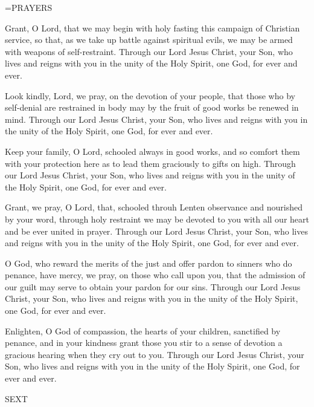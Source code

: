 \hangindent=\parindent \small PRAYERS
\begin{description}[labelindent=\parindent, noitemsep, leftmargin=*]
\item [Ash Wednesday:] 	Grant, O Lord, that we may begin with holy fasting this campaign of Christian service, so that, as we take up battle against spiritual evils, we may be armed with weapons of self-restraint. Through our Lord Jesus Christ, your Son, who lives and reigns with you in the unity of the Holy Spirit, one God, for ever and ever.
\item [Week 1:] 	Look kindly, Lord, we pray, on the devotion of your people, that those who by self-denial are restrained in body may by the fruit of good works be renewed in mind. Through our Lord Jesus Christ, your Son, who lives and reigns with you in the unity of the Holy Spirit, one God, for ever and ever.
\item [Week 2:] 	Keep your family, O Lord, schooled always in good works, and so comfort them with your protection here as to lead them graciously to gifts on high. Through our Lord Jesus Christ, your Son, who lives and reigns with you in the unity of the Holy Spirit, one God, for ever and ever.
\item [Week 3:] 	Grant, we pray, O Lord, that, schooled throuh Lenten observance and nourished by your word, through holy restraint we may be devoted to you with all our heart and be ever united in prayer. Through our Lord Jesus Christ, your Son, who lives and reigns with you in the unity of the Holy Spirit, one God, for ever and ever.
\item [Week 4:] 	O God, who reward the merits of the just and offer pardon to sinners who do penance, have mercy, we pray, on those who call upon you, that the admission of our guilt may serve to obtain your pardon for our sins. Through our Lord Jesus Christ, your Son, who lives and reigns with you in the unity of the Holy Spirit, one God, for ever and ever.
\item [Week 5:] 	Enlighten, O God of compassion, the hearts of your children, sanctified by penance, and in your kindness grant those you stir to a sense of devotion a gracious hearing when they cry out to you. Through our Lord Jesus Christ, your Son, who lives and reigns with you in the unity of the Holy Spirit, one God, for ever and ever.
\end{description}

\begin{flushleft}\normalsize SEXT\\\end{flushleft}

